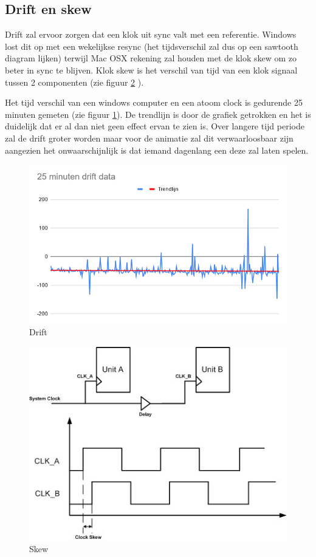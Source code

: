 \subsection{Drift en skew}

Drift zal ervoor zorgen dat een klok uit sync valt met een referentie. Windows lost dit op met een wekelijkse resync (het tijdsverschil zal dus op een sawtooth diagram lijken) terwijl Mac OSX rekening zal houden met de klok skew om zo beter in sync te blijven.
Klok skew is het verschil van tijd van een klok signaal tussen 2 componenten (zie figuur \ref{skew1} \cite{skew}).

Het tijd verschil van een windows computer en een atoom clock is gedurende 25 minuten gemeten (zie figuur \ref{drift}). De trendlijn is door de grafiek getrokken en het is duidelijk dat er al dan niet geen effect ervan te zien is. Over langere tijd periode zal de drift groter worden maar voor de animatie zal dit verwaarloosbaar zijn aangezien het onwaarschijnlijk is dat iemand dagenlang een deze zal laten spelen.

\begin{figure}[H]
\centering
\includegraphics[scale=0.3]{img/drift.png}
\caption{Drift} \label{drift}
\end{figure}

\begin{figure}[H]
\centering
\includegraphics[scale=0.7]{img/skew.jpg}
\caption{Skew} \label{skew1}
\end{figure}


